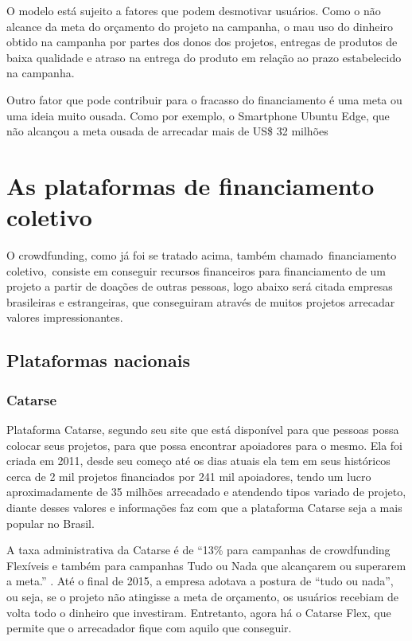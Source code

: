 \documentclass{classe_cn}                 %
\begin{document}
O modelo está sujeito a fatores que podem desmotivar usuários. Como o não alcance da meta do orçamento do projeto na campanha, o mau uso do dinheiro obtido na campanha por partes dos donos dos projetos, entregas de produtos de baixa qualidade e atraso na entrega do produto em relação ao prazo estabelecido na campanha. \cite{PEREIRA:2016}

Outro fator que pode contribuir para o fracasso do financiamento é uma meta ou uma ideia muito ousada. Como por exemplo, o Smartphone Ubuntu Edge, que não alcançou a meta ousada de arrecadar mais de US\$ 32 milhões \cite{GAZETA:2017}

\section{As plataformas de financiamento coletivo}

O crowdfunding, como já foi se tratado acima, também chamado financiamento coletivo, consiste em conseguir recursos financeiros para financiamento de um projeto a partir de doações de outras pessoas, logo abaixo será citada empresas brasileiras e estrangeiras, que conseguiram através de muitos projetos arrecadar valores impressionantes.

\subsection{Plataformas nacionais}

\subsubsection{Catarse}

Plataforma Catarse, segundo seu site que está disponível para que pessoas possa colocar seus projetos, para que possa encontrar apoiadores para o mesmo. Ela foi criada em 2011, desde seu começo até os dias atuais ela tem em seus históricos cerca de 2 mil projetos financiados por 241 mil apoiadores, tendo um lucro aproximadamente de 35 milhões arrecadado e atendendo tipos variado de projeto, diante desses valores e informações faz com que a plataforma Catarse seja a mais popular no Brasil.

A taxa administrativa da Catarse é de “13\% para campanhas de crowdfunding Flexíveis e também para campanhas Tudo ou Nada que alcançarem ou superarem a meta.” \cite{BRASIL:2017}. Até o final de 2015, a empresa adotava a postura de “tudo ou nada”, ou seja, se o projeto não atingisse a meta de orçamento, os usuários recebiam de volta todo o dinheiro que investiram. Entretanto, agora há o Catarse Flex, que permite que o arrecadador fique com aquilo que conseguir.
\end{document}
